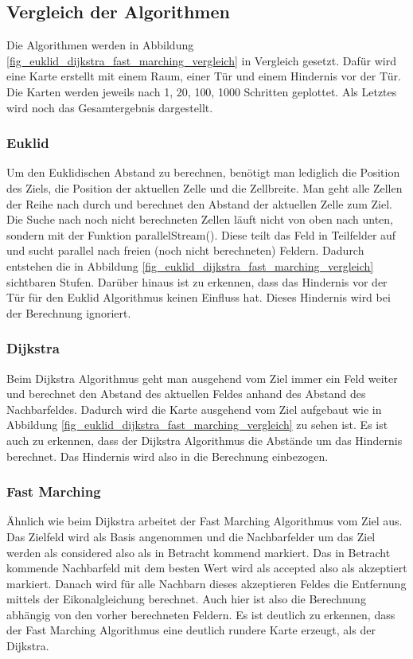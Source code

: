 \subsection{Vergleich der Algorithmen}
Die Algorithmen werden in Abbildung \ref{fig_euklid_dijkstra_fast_marching_vergleich} in Vergleich gesetzt. Dafür wird eine Karte erstellt mit einem Raum, einer Tür und einem Hindernis vor der Tür. Die Karten werden jeweils nach 1, 20, 100, 1000 Schritten geplottet. Als Letztes wird noch das Gesamtergebnis dargestellt.

\subsubsection{Euklid}
Um den Euklidischen Abstand zu berechnen, benötigt man lediglich die Position des Ziels, die Position der aktuellen Zelle und die Zellbreite. Man geht alle Zellen der Reihe nach durch und berechnet den Abstand der aktuellen Zelle zum Ziel. Die Suche nach noch nicht berechneten Zellen läuft nicht von oben nach unten, sondern mit der Funktion \glqq parallelStream()\grqq . Diese teilt das Feld in Teilfelder auf und sucht parallel nach freien (noch nicht berechneten) Feldern. Dadurch entstehen die in Abbildung \ref{fig_euklid_dijkstra_fast_marching_vergleich} sichtbaren Stufen. \cite{JavaParallelism} Darüber hinaus ist zu erkennen, dass das Hindernis vor der Tür für den Euklid Algorithmus keinen Einfluss hat. Dieses Hindernis wird bei der Berechnung ignoriert.

\subsubsection{Dijkstra}
Beim Dijkstra Algorithmus geht man ausgehend vom Ziel immer ein Feld weiter und berechnet den Abstand des aktuellen Feldes anhand des Abstand des Nachbarfeldes. Dadurch wird die Karte ausgehend vom Ziel aufgebaut wie in Abbildung \ref{fig_euklid_dijkstra_fast_marching_vergleich} zu sehen ist. Es ist auch zu erkennen, dass der Dijkstra Algorithmus die Abstände um das Hindernis berechnet. Das Hindernis wird also in die Berechnung einbezogen.

\subsubsection{Fast Marching}
Ähnlich wie beim Dijkstra arbeitet der Fast Marching Algorithmus vom Ziel aus. Das Zielfeld wird als Basis angenommen und die Nachbarfelder um das Ziel werden als \glqq considered\grqq{} also als \glqq in Betracht kommend\grqq{} markiert. Das in Betracht kommende Nachbarfeld mit dem besten Wert wird als \glqq accepted\grqq{} also als \glqq akzeptiert\grqq{} markiert. Danach wird für alle Nachbarn dieses akzeptieren Feldes die Entfernung mittels der Eikonalgleichung berechnet. Auch hier ist also die Berechnung abhängig von den vorher berechneten Feldern. Es ist deutlich zu erkennen, dass der Fast Marching Algorithmus eine deutlich rundere Karte erzeugt, als der Dijkstra.

